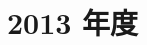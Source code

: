 \documentclass[../../hsm_tok_a.tex]{subfiles}
\begin{document}
    \section{2013 年度}

    

    \clearpage

    
\end{document}
